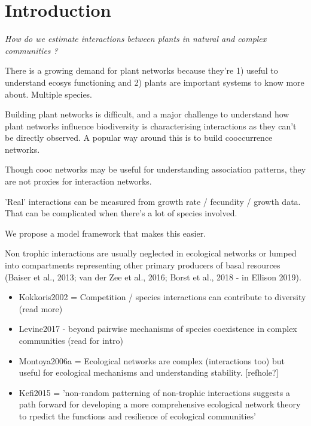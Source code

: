 \documentclass[a4,12pt]{article}
\begin{document}
\section{Introduction}

    \textit{How do we estimate interactions between plants in natural and complex communities ?}

    There is a growing demand for plant networks because they're 1) useful to understand ecosys functioning and 2) plants are important systems to know more about. Multiple species.    

    Building plant networks is difficult, and a major challenge to understand how plant networks influence biodiversity is characterising interactions as they can't be directly observed. A popular way around this is to build cooccurrence networks. 

    Though cooc networks may be useful for understanding association patterns, they are not proxies for interaction networks. 

    'Real' interactions can be measured from growth rate / fecundity / growth data. That can be complicated when there's a lot of species involved. 

    We propose a model framework that makes this easier.
 
  
    Non trophic interactions are usually neglected in ecological networks or lumped into compartments representing other primary producers of basal resources (Baiser et al., 2013; van der Zee et al., 2016; Borst et al., 2018 - in Ellison 2019).   

    \begin{itemize}
        \item Kokkoris2002 =  Competition / species interactions can contribute to diversity (read more)
        \item Levine2017 - beyond pairwise mechanisms of species coexistence in complex communities (read for intro)
        \item  Montoya2006a = Ecological networks are complex (interactions too) but useful for ecological mechanisms and understanding stability. [refhole?]
        \item Kefi2015 = 'non-random patterning of non-trophic interactions suggests a path forward for developing a more comprehensive ecological network theory to rpedict the functions and resilience of ecological communities'
    \end{itemize}
\end{document}
